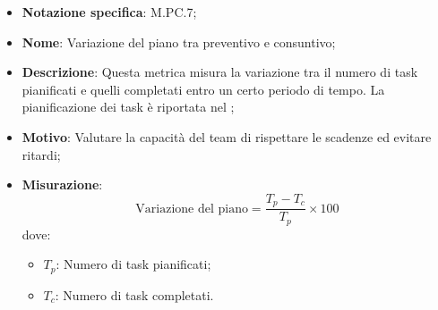 \begin{itemize}
    \item \textbf{Notazione specifica}: M.PC.7;
    \item \textbf{Nome}: Variazione del piano tra preventivo e consuntivo;
    \item \textbf{Descrizione}: Questa metrica misura la variazione tra il numero di task pianificati e quelli completati entro un certo periodo di tempo. La pianificazione dei task è riportata nel \PianoDiProgetto;
    \item \textbf{Motivo}: Valutare la capacità del team di rispettare le scadenze ed evitare ritardi;
    \item \textbf{Misurazione}:
    \[
        \text{Variazione del piano} = \frac{T_p - T_c}{T_p} \times 100
    \]
    dove:
    \begin{itemize}
        \item $T_{p}$: Numero di task pianificati;
        \item $T_{c}$: Numero di task completati.
    \end{itemize}
\end{itemize}
